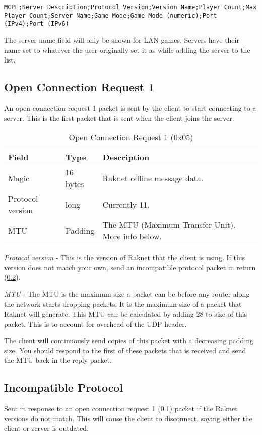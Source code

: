 \documentclass[12pt]{report}
\newcommand{\packet}[3]{
    \begin{table}[H]
        \label{tab:#1}
        \caption{#2}
        \vspace{0.25cm}
        \begin{tabularx}{\textwidth}{|l|l|X|}
            \hline
            \rowcolor{yellow}
            Field & Type & Description \\
            \hline
            #3
            \hline
        \end{tabularx}
    \end{table}
}
\begin{document}
\texttt{MCPE;Server Description;Protocol Version;Version Name;Player Count;Max Player Count;Server Name;Game Mode;Game Mode (numeric);Port (IPv4);Port (IPv6)}

The server name field will only be shown for LAN games.
Servers have their name set to whatever the user originally set it as while adding the server to the list.

\subsection{Open Connection Request 1}\label{subsec:open-connection-request1}

An open connection request 1 packet is sent by the client to start connecting to a server.
This is the first packet that is sent when the client joins the server.

\packet{open-connection-request1}{Open Connection Request 1 (0x05)}{
    Magic & 16 bytes & Raknet offline message data. \\
    \hline
    Protocol version & long & Currently 11. \\
    \hline
    MTU & Padding & The MTU (Maximum Transfer Unit). More info below. \\
}

\textit{Protocol version} - This is the version of Raknet that the client is using.
If this version does not match your own, send an incompatible protocol packet in return
(\ref{subsec:incompatible-protocol}). 

\textit{MTU} - The MTU is the maximum size a packet can be before any router along the network
starts dropping packets. It is the maximum size of a packet that Raknet will generate.
This MTU can be calculated by adding 28 to size of this packet. This is to account for overhead of the UDP header.

The client will continuously send copies of this packet with a decreasing padding size.
You should respond to the first of these packets that is received and send the MTU back in the reply packet.

\subsection{Incompatible Protocol}\label{subsec:incompatible-protocol}

Sent in response to an open connection request 1 (\ref{subsec:open-connection-request1}) packet if the Raknet versions do not match.
This will cause the client to disconnect, saying either the client or server is outdated.
\end{document}
